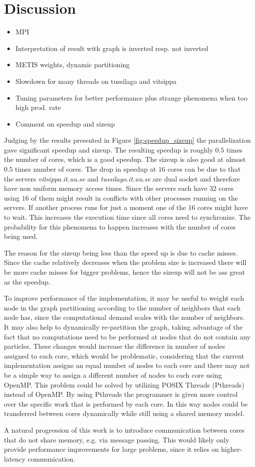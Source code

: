 \section{Discussion}
\label{sec:discussion}

\begin{itemize}
\item MPI
\item Interpretation of result with graph is inverted resp. not inverted
\item METIS weights, dynamic partitioning
\item Slowdown for many threads on tussilago and vitsippa
\item Tuning parameters for better performance plus strange phenomena when too high prod. rate
\item Comment on speedup and sizeup
\end{itemize}

Judging by the results presented in Figure \ref{fig:speedup_sizeup} the parallelization gave significant speedup and sizeup. The resulting speedup is roughly $0.5$ times the number of cores, which is a good speedup. The sizeup is also good at almost $0.5$ times number of cores. The drop in speedup at $16$ cores can be due to that the servers \textit{vitsippa.it.uu.se} and \textit{tussilago.it.uu.se} are dual socket and therefore have non uniform memory access times. Since the servers each have $32$ cores using $16$ of them might result in conflicts with other processes running on the servers. If another process runs for just a moment one of the $16$ cores might have to wait. This increases the execution time since all cores need to synchronize. The probability for this phenomena to happen increases with the number of cores being used.

The reason for the sizeup being less than the speed up is due to cache misses. Since the cache relatively decreases when the problem size is increased there will be more cache misses for bigger problems, hence the sizeup will not be ass great as the speedup. 

To improve performance of the implementation, it may be useful to weight each node in the graph partitioning according to the number of neighbors that each node has, since the computational demand scales with the number of neighbors. It may also help to dynamically re-partition the graph, taking advantage of the fact that no computations need to be performed at nodes that do not contain any particles. These changes would increase the difference in number of nodes assigned to each core, which would be problematic, considering that the current implementation assigns an equal number of nodes to each core and there may not be a simple way to assign a different number of nodes to each core using OpenMP. This problem could be solved by utilizing POSIX Threads (Pthreads) instead of OpenMP. By using Pthreads the programmer is given more control over the specific work that is performed by each core. In this way nodes could be transferred between cores dynamically while still using a shared memory model.

A natural progression of this work is to introduce communication between cores that do not share memory, e.g. via message passing. This would likely only provide performance improvements for large problems, since it relies on higher-latency communication.